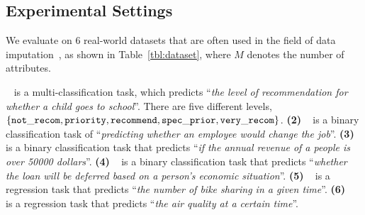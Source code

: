 \subsection{Experimental Settings}

 We evaluate on 6 real-world datasets that are often used in the field of data imputation~\cite{DBLP:conf/icde/LiRBZCZ21, liu2021adaptive, DBLP:journals/pvldb/KrishnanWWFG16,DBLP:journals/pvldb/KarlasLWGC0020}, as shown in Table~\ref{tbl:dataset}, where $M$ denotes the number of attributes.   


~\cite{nursery} is a multi-classification task, which  predicts ``{\it the level of recommendation for whether a child goes to school}''. There are five different levels, \ie $\{ {\tt not\_recom, priority, recommend, spec\_prior, very\_recom} \}$. %
{\bf (2) \hr}~\cite{chai2022selective} is a binary classification task of ``{\it predicting whether an employee would change the job}''.  %
{\bf (3) \adult}~\cite{adult} is a binary classification task that predicts ``{\it if the annual revenue of a people is over 50000 dollars}''. %
{\bf (4) \credit}~\cite{kaggle} is a binary classification task that predicts ``{\it whether the loan will be deferred based on a person's economic situation}''.  %
{\bf (5) \bike}~\cite{bike} is a regression task that predicts ``{\it the number of bike sharing in a given time}''. %
{\bf (6) \air}~\cite{auctus} is a regression task that predicts ``{\it the air quality at a certain time}''. %

